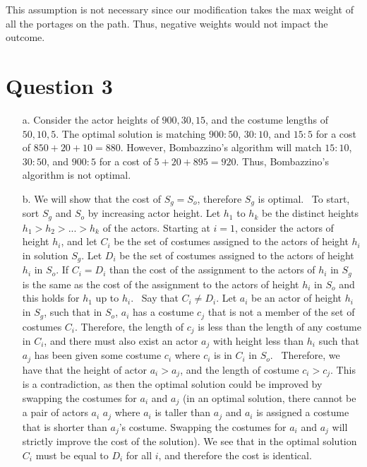 \documentclass[12pt]{article}
\begin{document}
\begin{enumerate}
    This assumption is not necessary since our modification takes the max weight of all the portages on the path.
    Thus, negative weights would not impact the outcome.\\
\end{enumerate}
\section*{Question 3} 
\begin{enumerate}
    \item[a.] Consider the actor heights of $900, 30, 15$, and the costume lengths of $50, 10, 5$. The optimal solution is matching $900 : 50$, $30 : 10$, and $15 : 5$ for a cost of $850 + 20 + 10 = 880$. However, Bombazzino's algorithm will match $15 : 10$, $30 : 50$, and $900 : 5$ for a cost of $5 + 20 + 895 = 920$. Thus, Bombazzino's algorithm is not optimal.
    \item[b.] We will show that the cost of $S_g = S_o$, therefore $S_g$ is optimal.
    \newline \,
    \newline
    To start, sort $S_g$ and $S_o$ by increasing actor height. Let $h_1$ to $h_k$ be the distinct heights $h_1 > h_2 > ... > h_k$ of the actors. Starting at $i = 1$, consider the actors of height $h_i$, and let $C_i$ be the set of costumes assigned to the actors of height $h_i$ in solution $S_g$. Let $D_i$ be the set of costumes assigned to the actors of height $h_i$ in $S_o$. If $C_i = D_i$ than the cost of the assignment to the actors of $h_i$ in $S_g$ is the same as the cost of the assignment to the actors of height $h_i$ in $S_o$ and this holds for $h_1$ up to $h_i$.
    \newline \,
    \newline
    Say that $C_i \neq D_i$. Let $a_i$ be an actor of height $h_i$ in $S_g$, such that in $S_o$, $a_i$ has a costume $c_j$ that is not a member of the set of costumes $C_i$. Therefore, the length of $c_j$ is less than the length of any costume in $C_i$, and there must also exist an actor $a_j$ with height less than $h_i$ such that $a_j$ has been given some costume $c_i$ where $c_i$ is in $C_i$ in $S_o$.
    \newline \,
    \newline
    Therefore, we have that the height of actor $a_i > a_j$, and the length of costume $c_i > c_j$. This is a contradiction, as then the optimal solution could be improved by swapping the costumes for $a_i$ and $a_j$ (in an optimal solution, there cannot be a pair of actors $a_i$ $a_j$ where $a_i$ is taller than $a_j$ and $a_i$ is assigned a costume that is shorter than $a_j$'s costume. Swapping the costumes for $a_i$ and $a_j$ will strictly improve the cost of the solution). We see that in the optimal solution $C_i$ must be equal to $D_i$ for all $i$, and therefore the cost is identical.

\end{enumerate}
\end{document}

